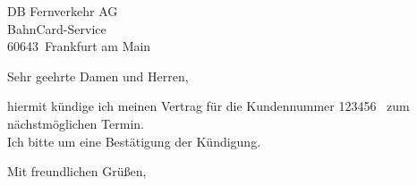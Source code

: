 \documentclass[a4paper, 12pt, KOMAold]{scrlttr2}
\newcommand{\Kundennr}{123456}    %
\newcommand{\Empfaenger}{DB Fernverkehr AG} %
\newcommand{\EStrasse}{BahnCard-Service}    %
\newcommand{\EPLZ}{60643}                   %
\newcommand{\EOrt}{Frankfurt am Main}       %
\newcommand{\Kuendigungsdatum}{nächstmöglichen Termin}              %
\begin{document}
    \begin{letter}{\Empfaenger \\ \EStrasse \\ \EPLZ~\EOrt}
    \date{\today}%
    \subject{Kündigung}
    \opening{Sehr geehrte Damen und Herren,}
    hiermit kündige ich meinen Vertrag für die Kundennummer 
    \Kundennr~ zum \Kuendigungsdatum.\\
 
    \noindent Ich bitte um eine Bestätigung der Kündigung.
    \closing{Mit freundlichen Grüßen,}
    \end{letter}
\end{document}
